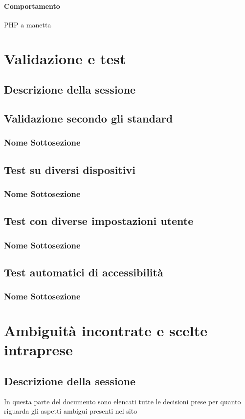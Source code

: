 \documentclass[openany, a4paper, 12pt]{report}
\begin{document}
	\subsubsection{Comportamento}
	PHP a manetta
	
	\chapter{Validazione e test}
	\section{Descrizione della sessione}
	\section{Validazione secondo gli standard}
	\subsection{Nome Sottosezione}
	\section{Test su diversi dispositivi}
	\subsection{Nome Sottosezione}
	\section{Test con diverse impostazioni utente}
	\subsection{Nome Sottosezione}
	\section{Test automatici di accessibilità}
	\subsection{Nome Sottosezione}
	
	\chapter{Ambiguità incontrate e scelte intraprese}
		\section{Descrizione della sessione}
			In questa parte del documento sono elencati tutte le decisioni prese per quanto riguarda gli aspetti ambigui presenti nel sito\\
\end{document}
